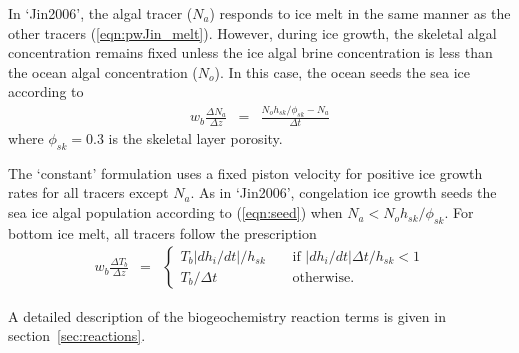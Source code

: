 In  `Jin2006', the algal tracer ($N_a$) responds to ice melt in the same manner as
the other tracers (\ref{eqn:pwJin_melt}).  However, during ice growth, the skeletal algal concentration remains fixed unless the ice algal brine concentration is less than the ocean algal concentration ($N_o$).  In this case, the ocean seeds the sea ice according to  
\begin{eqnarray}
\label{eqn:seed}
w_b \frac{\Delta N_a}{\Delta z} & = & \frac{N_oh_{sk}/\phi_{sk} -
  N_a}{\Delta t}
\end{eqnarray}
where $\phi_{sk}=0.3$ is the skeletal layer porosity.

The `constant' formulation uses a fixed piston velocity for positive ice growth rates for all tracers except $N_a$.  As
in `Jin2006', congelation ice growth seeds the sea ice algal
population according to (\ref{eqn:seed}) when $N_a < N_o
h_{sk}/\phi_{sk}$. For bottom ice melt, all tracers follow the prescription
\begin{eqnarray} 
 w_b \frac{\Delta T_b}{\Delta z} & = &  \left\{ \begin{array}{ll}
   T_b   |dh_i/dt|/h_{sk} \ \ \ \ \ &   \mbox{if }
 |dh_i/dt|\Delta t/h_{sk} < 1  \\
 T_b/\Delta t & \mbox{otherwise.}   \end{array} \right.  
\label{eqn:constant_melt}
\end{eqnarray}

A detailed description of the biogeochemistry reaction terms is given
in section~\ref{sec:reactions}. 

